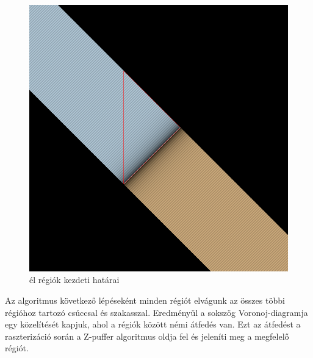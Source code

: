 \begin{figure}[H]
	\centering
	\includegraphics[width=.6\linewidth]{images/initial_segment_regions.png}
	\caption{él régiók kezdeti határai}
	\label{fig:initial_segment_regions-1}
\end{figure}

Az algoritmus következő lépéseként minden régiót elvágunk az összes többi régióhoz tartozó csúccsal és szakasszal. Eredményül a sokszög Voronoj-diagramja egy közelítését kapjuk, ahol a régiók között némi átfedés van. Ezt az átfedést a raszterizáció során a Z-puffer algoritmus oldja fel és jeleníti meg a megfelelő régiót.

